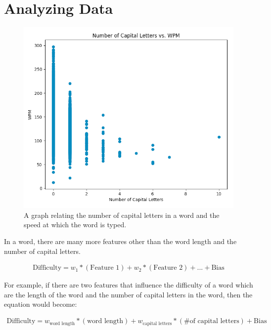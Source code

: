\documentclass[12pt]{article}
\begin{document}
\section*{Analyzing Data}

\begin{figure}
	\caption{A graph relating the number of capital letters in a word and the speed at which the word is typed.}
	\includegraphics[width=\textwidth]{capital-letters-vs-wpm.png}
\end{figure}

In a word, there are many more features other than the word length and the number of capital letters.

\begin{align*}
	\text{Difficulty} = w_1 * (\text{Feature 1}) + w_2 * (\text{Feature 2}) + ... + \text{Bias}
\end{align*}

For example, if there are two features that influence the difficulty of a word which are the length of the word and the number of capital letters in the word, then the equation would become:

\begin{align*}
	\text{Difficulty} = w_{\text{word length}} * (\text{word length}) + w_{\text{capital letters}} * (\text{\# of capital letters}) + \text{Bias}
\end{align*}
\end{document}
